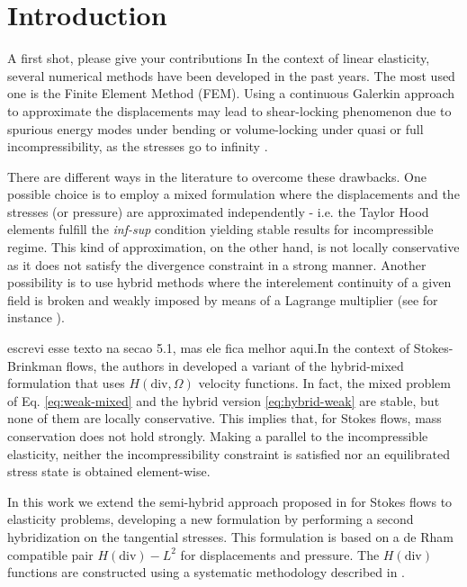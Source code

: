 \documentclass[english,11pt,3p,number,sort&compress]{elsarticle}
\newcommand{\giovane}{\color{red}{\bf\Large GA} \color{cyan} }
\begin{document}
\section{Introduction}

{\giovane A first shot, please give your contributions}
In the context of linear elasticity, several numerical methods have been developed in the past years. The most used one is the Finite Element Method (FEM). Using a continuous Galerkin approach to approximate the displacements may lead to shear-locking phenomenon due to spurious energy modes under bending \cite{bletzinger2000unified,belytschko1985stress} or volume-locking under quasi or full incompressibility, as the stresses go to infinity \cite{neto2005f,cervera2003mixed}.

There are different ways in the literature to overcome these drawbacks. One possible choice is to employ a mixed formulation \cite{brezzi2012mixed,arnold1988new} where the displacements and the stresses (or pressure) are approximated independently - i.e. the Taylor Hood elements \cite{taylor1973numerical} fulfill the \textit{inf-sup} condition yielding stable results for incompressible regime. This kind of approximation, on the other hand, is not locally conservative as it does not satisfy the divergence constraint in a strong manner. Another possibility is to use hybrid methods where the interelement continuity of a given field is broken and weakly imposed by means of a Lagrange multiplier (see for instance \cite{raviart1977primal,harder2016hybrid,farhloul1997dual}).

{\giovane escrevi esse texto na secao 5.1, mas ele fica melhor aqui.}In the context of Stokes-Brinkman flows, the authors in \cite{carvalho2024semi} developed a variant of the hybrid-mixed formulation that uses $H(\text{div},\Omega)$ velocity functions. In fact, the mixed problem of Eq. \eqref{eq:weak-mixed} and the hybrid version \eqref{eq:hybrid-weak} are stable, but none of them are locally conservative. This implies that, for Stokes flows, mass conservation does not hold strongly. Making a parallel to the incompressible elasticity, neither the incompressibility constraint is satisfied nor an equilibrated stress state is obtained element-wise.

In this work we extend the semi-hybrid approach proposed in \cite{carvalho2024semi} for Stokes flows to elasticity problems, developing a new formulation by performing a second hybridization on the tangential stresses. This formulation is based on a de Rham compatible pair $H(\text{div})-L^2$ for displacements and pressure. The $H(\text{div})$ functions are constructed using a systematic methodology described in \cite{devloo2022efficient,de2013new}.
\end{document}
